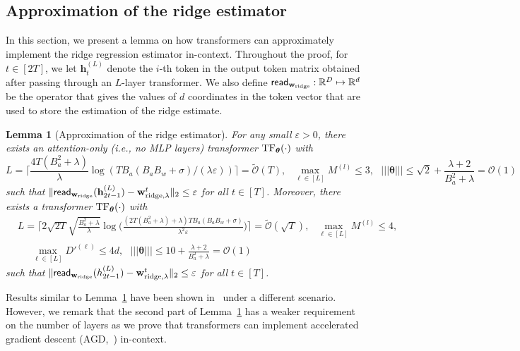 \documentclass[10pt]{article}
\newtheorem{lemma}[theorem]{Lemma}
\newcommand{\eps}{\varepsilon}
\renewcommand{\cO}{\mathcal{O}}
\newcommand{\<}{\left\langle}
\renewcommand{\>}{\right\rangle}
\newcommand{\lth}{{(\ell)}}
\newcommand{\TF}{{\rm TF}}
\renewcommand{\read}{{\sf read}}
\newcommand{\ridge}{{\rm ridge}}
\newcommand{\nrmp}[1]{{\left|\!\left|\!\left|{#1}\right|\!\right|\!\right|}}
\newcommand{\R}{\mathbb{R}}
\newcommand{\tcO}{{\tilde{\mathcal O}}}
\newcommand{\totlen}{{T}}
\newcommand{\hidden}{{D'}}
\def\btheta{{\boldsymbol \theta}}
\def\bh{{\mathbf h}}
\def\bw{{\mathbf w}}
\begin{document}
\subsection{Approximation of the ridge estimator}\label{app:approx-ridge-estimator}
In this section, we present a lemma on how transformers can  approximately implement the ridge regression estimator in-context.
Throughout the proof, for $t\in[2\totlen]$,  we let $\bh_{t}^{(L)}$ denote the $i$-th token in the output token matrix obtained after passing through an $L$-layer transformer. We also define  $\read_{\bw_\ridge}: \R^{D}\mapsto\R^{d}$ be the operator that gives the values of  $d$ coordinates  in the token vector that are used to store the estimation of  the ridge estimate.
\begin{lemma}[Approximation of the ridge estimator]\label{lm:approx_ridge}
For any small $\eps>0$, there exists an attention-only (i.e., no MLP layers) transformer $\TF_\btheta(\cdot)$ with
$$L=\Big\lceil\frac{4T(B_a^2+\lambda)}{\lambda}\log({TB_a(B_aB_w+\sigma)}/({\lambda}\eps))\Big\rceil=\tcO(T),~~~\max_{\ell\in[L]}M^{(l)}\leq3,~~~ \nrmp{\btheta}\leq  \sqrt{2}+\frac{\lambda+2}{B_a^2+\lambda}=\cO(1)$$ such that $\|\read_{\bw_{\ridge}}(\bh_{2t-1}^{(L)})-\bw^t_{\ridge,\lambda}\|_2\leq\eps$ for all $t\in[T]$.
Moreover, there exists a  transformer $\TF_\btheta(\cdot)$ with  \begin{align*}&L=\Big\lceil2\sqrt{2T}\sqrt{\frac{B_a^2+\lambda}{\lambda}}\log\Big(\frac{(2T(B_a^2+\lambda)+\lambda)TB_a(B_aB_w+\sigma)}{\lambda^2\eps}\Big)\Big\rceil=\tcO(\sqrt{T}),~~~\max_{\ell\in[L]}M^{(l)}\leq4,~~~ \\
&~~~~~~\max_{\ell\in[L]}\hidden^{\lth}\leq 4d,~~~\nrmp{\btheta}\leq  10+\frac{\lambda+2}{B_a^2+\lambda}=\cO(1) \end{align*}
 such that $\|\read_{\bw_{\ridge}}(h_{2t-1}^{(L)})-\bw^t_{\ridge,\lambda}\|_2\leq\eps$ for all $t\in[T]$.
\end{lemma}
Results similar to Lemma~\ref{lm:approx_ridge} have been shown in~\cite{bai2023transformers} under a different scenario.   However, we remark that  the second part of Lemma~\ref{lm:approx_ridge} has a weaker requirement on the number of layers as we prove that transformers can implement accelerated gradient descent (AGD,~\cite{nesterov2003introductory}) in-context.
\end{document}
